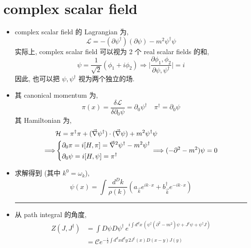 \section{complex scalar field} \label{4.4}
\begin{itemize}
	\item complex scalar field 的 Lagrangian 为,
	\begin{equation}
		\mathcal{L} = - (\partial \psi^\dag) (\partial \psi) - m^2 \psi^\dag \psi
	\end{equation}
	实际上, complex scalar field 可以视为 2 个 real scalar fields 的和,
	\begin{equation}
		\psi = \frac{1}{\sqrt{2}} (\phi_1 + i \phi_2) \Longrightarrow \Big| \frac{\partial \phi_1, \phi_2}{\partial \psi, \psi^\dag} \Big| = i
	\end{equation}
	因此, 也可以把 $\psi, \psi^\dag$ 视为两个独立的场.
	
	\item 其 canonical momentum 为,
	\begin{equation}
		\pi(x) = \frac{\delta \mathcal{L}}{\delta \partial_0 \psi} = \partial_0 \psi^\dag \quad \pi^\dag = \partial_0 \psi
	\end{equation}
	其 Hamiltonian 为,
	\begin{align}
		& \mathcal{H} = \pi^\dag \pi + (\vec{\nabla} \psi^\dag) \cdot (\vec{\nabla} \psi) + m^2 \psi^\dag \psi \\
		\Longrightarrow & \begin{dcases}
			\partial_0 \pi = i [H, \pi] = \vec{\nabla}^2 \psi^\dag - m^2 \psi^\dag \\
			\partial_0 \psi = i [H, \psi] = \pi^\dag
		\end{dcases} \Longrightarrow (- \partial^2 - m^2) \psi = 0
	\end{align}
	
	\item 求解得到 (其中 $k^0 = \omega_k$),
	\begin{equation}
		\psi(x) = \int \frac{d^D k}{\rho(k)} (a_{\vec{k}} e^{i k \cdot x} + b^\dag_{\vec{k}} e^{- i k \cdot x})
	\end{equation}
	
	\noindent\rule[0.5ex]{\linewidth}{0.5pt} %
	
	\item 从 path integral 的角度,
	\begin{align}
		Z(J, J^\dag) &= \int D\psi D\psi^\dag \, e^{i \int d^d x \, (\psi^\dag (\partial^2 - m^2) \psi + J^\dag \psi + \psi^\dag J)} \\
		&= \mathcal{C} e^{- \frac{i}{2} \int d^d x d^d y \, 2 J^\dag(x) D(x - y) J(y)}
	\end{align}
	

\end{itemize}
